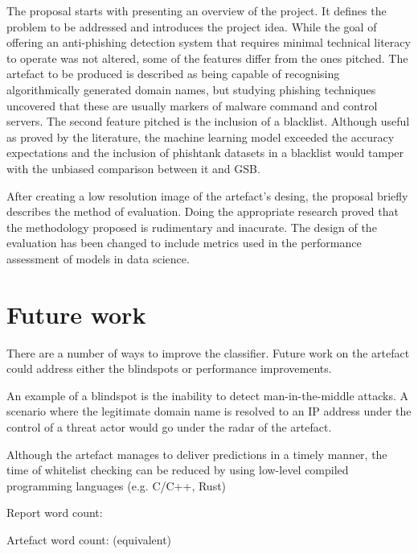 The proposal starts with presenting an overview of the project. It defines the problem to be addressed and introduces the project idea. While the goal of offering an anti-phishing detection system that requires minimal technical literacy to operate was not altered, some of the features differ from the ones pitched. The artefact to be produced is described as being capable of recognising algorithmically generated domain names, but studying phishing techniques uncovered that these are usually markers of malware command and control servers. The second feature pitched is the inclusion of a blacklist. Although useful as proved by the literature, the machine learning model exceeded the accuracy expectations and the inclusion of phishtank datasets in a blacklist would tamper with the unbiased comparison between it and GSB.

After creating a low resolution image of the artefact's desing, the proposal briefly describes the method of evaluation. Doing the appropriate research proved that the methodology proposed is rudimentary and inacurate. The design of the evaluation has been changed to include metrics used in the performance assessment of models in data science.

\section{Future work}
There are a number of ways to improve the classifier. Future work on the artefact could address either the blindspots or performance improvements.

An example of a blindspot is the inability to detect man-in-the-middle attacks. A scenario where the legitimate domain name is resolved to an IP address under the control of a threat actor would go under the radar of the artefact.

Although the artefact manages to deliver predictions in a timely manner, the time of whitelist checking can be reduced by using low-level compiled programming languages (e.g. C/C++, Rust)

% 

\clearpage
\vspace*{\fill}
\begin{center}
\begin{minipage}{.6\textwidth}
\centering 
Report word count:

Artefact word count: (equivalent)
\end{minipage}
\end{center}
\vfill
\clearpage


